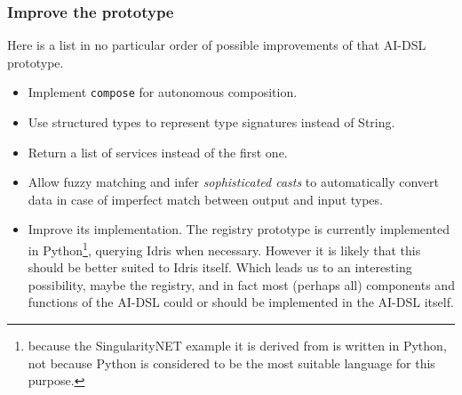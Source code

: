 \documentclass[]{report}
\begin{document}
\subsubsection{Improve the prototype}
Here is a list in no particular order of possible improvements of that
AI-DSL prototype.
\begin{itemize}
\item Implement \texttt{compose} for autonomous composition.
\item Use structured types to represent type signatures instead of
  String.
\item Return a list of services instead of the first one.
\item Allow fuzzy matching and infer \emph{sophisticated casts} to
  automatically convert data in case of imperfect match between output
  and input types.
\item Improve its implementation.  The registry prototype is currently
  implemented in Python\footnote{because the SingularityNET example it
  is derived from is written in Python, not because Python is
  considered to be the most suitable language for this purpose.},
  querying Idris when necessary.  However it is likely that this
  should be better suited to Idris itself.  Which leads us to an
  interesting possibility, maybe the registry, and in fact most
  (perhaps all) components and functions of the AI-DSL could or should
  be implemented in the AI-DSL itself.
\end{itemize}
\end{document}
